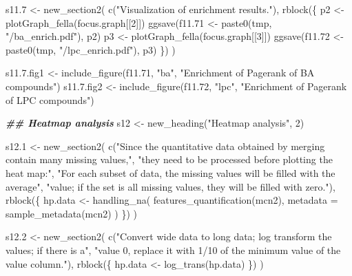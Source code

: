 \documentclass[
]{article}
\newenvironment{Shaded}{\begin{snugshade}}{\end{snugshade}}
\newcommand{\AttributeTok}[1]{\textcolor[rgb]{0.77,0.63,0.00}{#1}}
\newcommand{\DecValTok}[1]{\textcolor[rgb]{0.00,0.00,0.81}{#1}}
\newcommand{\DocumentationTok}[1]{\textcolor[rgb]{0.56,0.35,0.01}{\textbf{\textit{#1}}}}
\newcommand{\FloatTok}[1]{\textcolor[rgb]{0.00,0.00,0.81}{#1}}
\newcommand{\FunctionTok}[1]{\textcolor[rgb]{0.00,0.00,0.00}{#1}}
\newcommand{\NormalTok}[1]{#1}
\newcommand{\OtherTok}[1]{\textcolor[rgb]{0.56,0.35,0.01}{#1}}
\newcommand{\StringTok}[1]{\textcolor[rgb]{0.31,0.60,0.02}{#1}}
\begin{document}
\begin{Shaded}
\begin{Highlighting}[]
\NormalTok{s11}\FloatTok{.7} \OtherTok{\textless{}{-}} \FunctionTok{new\_section2}\NormalTok{(}
  \FunctionTok{c}\NormalTok{(}\StringTok{"Visualization of enrichment results."}\NormalTok{),}
  \FunctionTok{rblock}\NormalTok{(\{}
\NormalTok{    p2 }\OtherTok{\textless{}{-}} \FunctionTok{plotGraph\_fella}\NormalTok{(focus.graph[[}\DecValTok{2}\NormalTok{]])}
    \FunctionTok{ggsave}\NormalTok{(f11}\FloatTok{.71} \OtherTok{\textless{}{-}} \FunctionTok{paste0}\NormalTok{(tmp, }\StringTok{"/ba\_enrich.pdf"}\NormalTok{), p2)}
\NormalTok{    p3 }\OtherTok{\textless{}{-}} \FunctionTok{plotGraph\_fella}\NormalTok{(focus.graph[[}\DecValTok{3}\NormalTok{]])}
    \FunctionTok{ggsave}\NormalTok{(f11}\FloatTok{.72} \OtherTok{\textless{}{-}} \FunctionTok{paste0}\NormalTok{(tmp, }\StringTok{"/lpc\_enrich.pdf"}\NormalTok{), p3)}
\NormalTok{  \})}
\NormalTok{)}

\NormalTok{s11.}\FloatTok{7.}\NormalTok{fig1 }\OtherTok{\textless{}{-}} \FunctionTok{include\_figure}\NormalTok{(f11}\FloatTok{.71}\NormalTok{, }\StringTok{"ba"}\NormalTok{, }\StringTok{"Enrichment of Pagerank of BA compounds"}\NormalTok{)}
\NormalTok{s11.}\FloatTok{7.}\NormalTok{fig2 }\OtherTok{\textless{}{-}} \FunctionTok{include\_figure}\NormalTok{(f11}\FloatTok{.72}\NormalTok{, }\StringTok{"lpc"}\NormalTok{, }\StringTok{"Enrichment of Pagerank of LPC compounds"}\NormalTok{)}

\DocumentationTok{\#\# Heatmap analysis}
\NormalTok{s12 }\OtherTok{\textless{}{-}} \FunctionTok{new\_heading}\NormalTok{(}\StringTok{"Heatmap analysis"}\NormalTok{, }\DecValTok{2}\NormalTok{)}

\NormalTok{s12}\FloatTok{.1} \OtherTok{\textless{}{-}} \FunctionTok{new\_section2}\NormalTok{(}
  \FunctionTok{c}\NormalTok{(}\StringTok{"Since the quantitative data obtained by merging contain many missing values,"}\NormalTok{,}
    \StringTok{"they need to be processed before plotting the heat map:"}\NormalTok{,}
    \StringTok{"For each subset of data, the missing values will be filled with the average"}\NormalTok{,}
    \StringTok{"value; if the set is all missing values, they will be filled with zero."}\NormalTok{),}
  \FunctionTok{rblock}\NormalTok{(\{}
\NormalTok{    hp.data }\OtherTok{\textless{}{-}} \FunctionTok{handling\_na}\NormalTok{(}
      \FunctionTok{features\_quantification}\NormalTok{(mcn2),}
      \AttributeTok{metadata =} \FunctionTok{sample\_metadata}\NormalTok{(mcn2)}
\NormalTok{    )}
\NormalTok{  \})}
\NormalTok{)}

\NormalTok{s12}\FloatTok{.2} \OtherTok{\textless{}{-}} \FunctionTok{new\_section2}\NormalTok{(}
  \FunctionTok{c}\NormalTok{(}\StringTok{"Convert wide data to long data; log transform the values; if there is a"}\NormalTok{,}
    \StringTok{"value 0, replace it with 1/10 of the minimum value of the value column."}\NormalTok{),}
  \FunctionTok{rblock}\NormalTok{(\{}
\NormalTok{    hp.data }\OtherTok{\textless{}{-}} \FunctionTok{log\_trans}\NormalTok{(hp.data)}
\NormalTok{  \})}
\NormalTok{)}


\end{Highlighting}
\end{Shaded}
\end{document}
